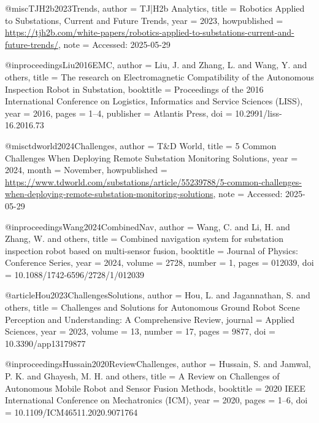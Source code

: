 @misc{TJH2b2023Trends,
  author       = {{TJ|H2b Analytics}},
  title        = {Robotics Applied to Substations, Current and Future Trends},
  year         = {2023},
  howpublished = {\url{https://tjh2b.com/white-papers/robotics-applied-to-substations-current-and-future-trends/}},
  note         = {Accessed: 2025-05-29}
}



@inproceedings{Liu2016EMC,
  author    = {Liu, J. and Zhang, L. and Wang, Y. and others},
  title     = {The research on Electromagnetic Compatibility of the Autonomous Inspection Robot in Substation},
  booktitle = {Proceedings of the 2016 International Conference on Logistics, Informatics and Service Sciences (LISS)},
  year      = {2016},
  pages     = {1--4},
  publisher = {Atlantis Press},
  doi       = {10.2991/liss-16.2016.73}
}

@misc{tdworld2024Challenges,
  author       = {T&D World},
  title        = {5 Common Challenges When Deploying Remote Substation Monitoring Solutions},
  year         = {2024},
  month        = {November},
  howpublished = {\url{https://www.tdworld.com/substations/article/55239788/5-common-challenges-when-deploying-remote-substation-monitoring-solutions}},
  note         = {Accessed: 2025-05-29}
}

@inproceedings{Wang2024CombinedNav,
  author    = {Wang, C. and Li, H. and Zhang, W. and others},
  title     = {Combined navigation system for substation inspection robot based on multi-sensor fusion},
  booktitle = {Journal of Physics: Conference Series},
  year      = {2024},
  volume    = {2728},
  number    = {1},
  pages     = {012039},
  doi       = {10.1088/1742-6596/2728/1/012039}
}

@article{Hou2023ChallengesSolutions,
  author    = {Hou, L. and Jagannathan, S. and others},
  title     = {Challenges and Solutions for Autonomous Ground Robot Scene Perception and Understanding: A Comprehensive Review},
  journal   = {Applied Sciences},
  year      = {2023},
  volume    = {13},
  number    = {17},
  pages     = {9877},
  doi       = {10.3390/app13179877}
}

@inproceedings{Hussain2020ReviewChallenges,
  author    = {Hussain, S. and Jamwal, P. K. and Ghayesh, M. H. and others},
  title     = {A Review on Challenges of Autonomous Mobile Robot and Sensor Fusion Methods},
  booktitle = {2020 IEEE International Conference on Mechatronics (ICM)},
  year      = {2020},
  pages     = {1--6},
  doi       = {10.1109/ICM46511.2020.9071764}
}



